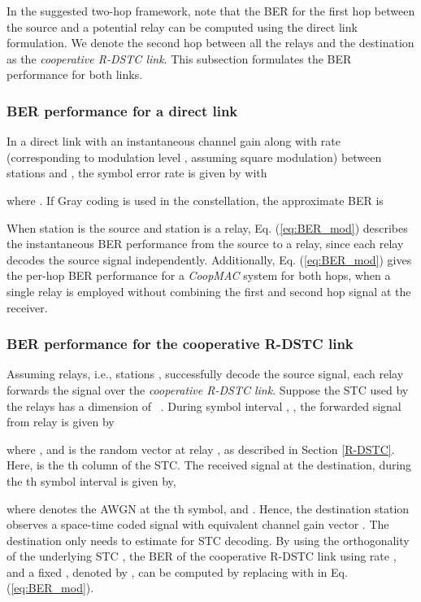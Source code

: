\documentclass[peerreview,draftcls,onecolumn,12pt,a4paper]{IEEEtran}
\begin{document}
In the suggested two-hop framework, note that the BER for the
first hop between the source and a potential relay can be computed
using the direct link formulation. We denote the second hop between
all the relays and the destination  as the {\em cooperative R-DSTC
link}. This subsection formulates the BER performance for both
links.


\subsubsection{BER performance for a direct link}\label{sec:singlelinkber}
In a direct link with an instantaneous channel gain  along
with rate  (corresponding to modulation level , assuming
square modulation) between stations  and , the symbol error
rate is given by 
with

where . If Gray coding is used in the constellation, the approximate BER is



When station  is the source and station  is a relay, Eq.
(\ref{eq:BER_mod}) describes the instantaneous BER performance
from the source to a relay, since each relay decodes the source
signal independently. Additionally, Eq. (\ref{eq:BER_mod}) gives
the per-hop BER performance for a \emph{CoopMAC} system
\cite{coopmacliu} for both hops, when  a single relay is employed
without combining the first and second hop signal at the receiver.

\subsubsection{BER performance for the cooperative R-DSTC link}\label{sec:RDSTCber}
Assuming  relays, i.e., stations , successfully
decode the source signal, each relay forwards the signal over the
{\em cooperative R-DSTC link}. Suppose the STC used by the relays
has a dimension of  ~\cite{Jafarkhanistcbook}. During
symbol interval , , the forwarded signal from
relay  is given by

where , and  is the random vector
at relay , as described in Section \ref{R-DSTC}. Here,
 is the th column of the STC. The received
signal at the destination, during the th symbol interval is
given by,

where  denotes the AWGN at the th symbol, and
. Hence,
the destination station observes a space-time coded signal with
equivalent channel gain vector . The
destination only needs to estimate  for STC
decoding. By using the orthogonality of the underlying STC
\cite{Jafarkhanistcbook}, the BER of the cooperative R-DSTC link
using rate ,  and a fixed ,
denoted by , can
be computed by replacing  with 
in Eq. (\ref{eq:BER_mod}).
\end{document}
